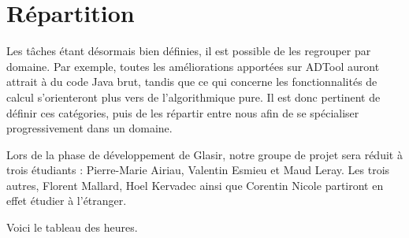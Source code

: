\section{Répartition}
	\label{sec:repartition}

	Les tâches étant désormais bien définies, il est possible de les regrouper par domaine. Par exemple, toutes les améliorations apportées sur ADTool auront attrait à du code Java brut, tandis que ce qui concerne les fonctionnalités de calcul s'orienteront plus vers de l'algorithmique pure. Il est donc pertinent de définir ces catégories, puis de les répartir entre nous afin de se \og spécialiser \fg{} progressivement dans un domaine.
	
	Lors de la phase de développement de Glasir, notre groupe de projet sera réduit à trois étudiants : Pierre-Marie {\sc Airiau}, Valentin {\sc Esmieu} et Maud {\sc Leray}. Les trois autres, Florent {\sc Mallard}, Hoel {\sc Kervadec} ainsi que Corentin {\sc Nicole} partiront en effet étudier à l'étranger.
	
	Voici le tableau des heures.
	
	
	
